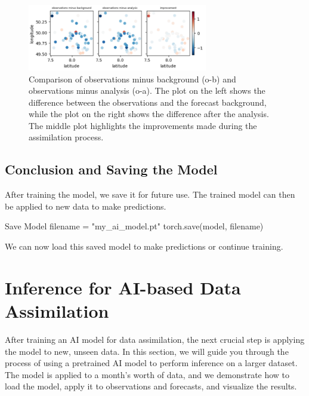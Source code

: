\begin{figure}[ht]
\centering
\includegraphics[width=0.7\textwidth]{images/aivar_o-b_o-a.png}
\caption{Comparison of observations minus background (o-b) and observations minus analysis (o-a). The plot on the left shows the difference between the observations and the forecast background, while the plot on the right shows the difference after the analysis. The middle plot highlights the improvements made during the assimilation process.}
\end{figure}

%
\subsection{Conclusion and Saving the Model}

After training the model, we save it for future use. The trained model can then be applied to new data to make predictions.

\begin{codeonly}{Save Model}
filename = "my_ai_model.pt"
torch.save(model, filename)
\end{codeonly}

We can now load this saved model to make predictions or continue training.


%
\section{Inference for AI-based Data Assimilation}

After training an AI model for data assimilation, the next crucial step is applying the model to new, unseen data. In this section, we will guide you through the process of using a pretrained AI model to perform inference on a larger dataset. The model is applied to a month's worth of data, and we demonstrate how to load the model, apply it to observations and forecasts, and visualize the results.

